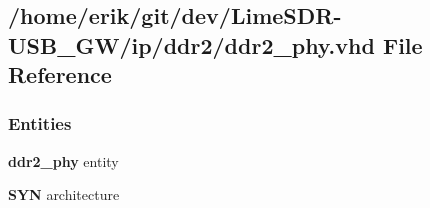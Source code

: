 \subsection{/home/erik/git/dev/\+Lime\+S\+D\+R-\/\+U\+S\+B\+\_\+\+G\+W/ip/ddr2/ddr2\+\_\+phy.vhd File Reference}
\label{ddr2__phy_8vhd}
\subsubsection*{Entities}
\begin{DoxyCompactItemize}
\item 
{\bf ddr2\+\_\+phy} entity
\item 
{\bf S\+YN} architecture
\end{DoxyCompactItemize}

